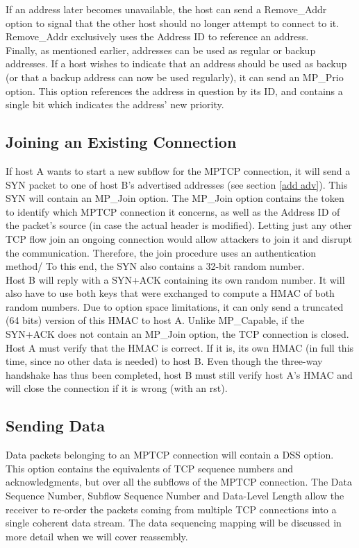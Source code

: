 \documentclass[12pt, a4paper, oneside]{article} %
\begin{document}
If an address later becomes unavailable, the host can send a Remove\_Addr option to signal that the other host should no longer attempt to connect to it. Remove\_Addr exclusively uses the Address ID to reference an address. \\

Finally, as mentioned earlier, addresses can be used as regular or backup addresses. If a host wishes to indicate that an address should be used as backup (or that a backup address can now be used regularly), it can send an MP\_Prio option. This option references the address in question by its ID, and contains a single bit which indicates the address' new priority.

\subsection{Joining an Existing Connection}
If host A wants to start a new subflow for the MPTCP connection, it will send a SYN packet to one of host B's advertised addresses (see section \ref{add adv}). This SYN will contain an MP\_Join option. The MP\_Join option contains the token to identify which MPTCP connection it concerns, as well as the Address ID of the packet's source (in case the actual header is modified). Letting just any other TCP flow join an ongoing connection would allow attackers to join it and disrupt the communication. Therefore, the join procedure uses an authentication method/ To this end, the SYN also contains a 32-bit random number. \\

Host B will reply with a SYN+ACK containing its own random number. It will also have to use both keys that were exchanged to compute a HMAC of both random numbers. Due to option space limitations, it can only send a truncated (64 bits) version of this HMAC to host A. Unlike MP\_Capable, if the SYN+ACK does not contain an MP\_Join option, the TCP connection is closed. \\

Host A must verify that the HMAC is correct. If it is, its own HMAC (in full this time, since no other data is needed) to host B. Even though the three-way handshake has thus been completed, host B must still verify host A's HMAC and will close the connection if it is wrong (with an rst).

\subsection{Sending Data}
Data packets belonging to an MPTCP connection will contain a DSS option. This option contains the equivalents of TCP sequence numbers and acknowledgments, but over all the subflows of the MPTCP connection. The Data Sequence Number, Subflow Sequence Number and Data-Level Length allow the receiver to re-order the packets coming from multiple TCP connections into a single coherent data stream. The data sequencing mapping will be discussed in more detail when we will cover reassembly. \\
\end{document}
